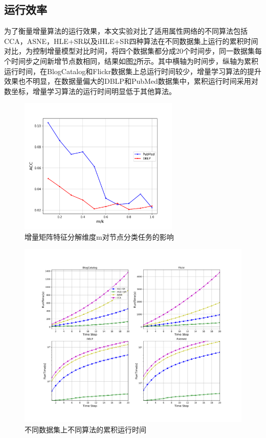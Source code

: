 \subsection{运行效率}
为了衡量增量算法的运行效果，本文实验对比了适用属性网络的不同算法包括CCA，ASNE，HLE+SR以及iHLE+SR四种算法在不同数据集上运行的累积时间对比，为控制增量模型对比时间，将四个数据集都分成20个时间步，同一数据集每个时间步之间新增节点数相同，结果如图\ref{fig:runtime}所示。其中横轴为时间步，纵轴为累积运行时间，在BlogCatalog和Flickr数据集上总运行时间较少，增量学习算法的提升效果也不明显，在数据量偏大的DBLP和PubMed数据集中，累积运行时间采用对数坐标，增量学习算法的运行时间明显低于其他算法。
\begin{figure}
	\centering
	\includegraphics[width=3in]{figures/parameter_analysis}
	\caption{增量矩阵特征分解维度m对节点分类任务的影响}
	\label{fig:parameter_analysis}
\end{figure}

\begin{figure}
	\centering
	\includegraphics[width=6.5in]{figures/runtime}
	\caption{不同数据集上不同算法的累积运行时间}
	\label{fig:runtime}
\end{figure}

